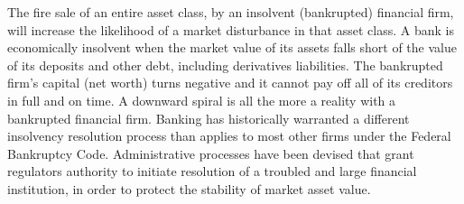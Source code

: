 The fire sale of an entire asset class, by an insolvent (bankrupted) financial firm, will increase the likelihood of a market disturbance in that asset class.  A bank is economically insolvent when the market value of its assets falls short of the value of its deposits and other debt, including derivatives liabilities. The bankrupted firm's capital (net worth) turns negative and it cannot pay off all of its creditors in full and on time.  A downward spiral is all the more a reality with a bankrupted financial firm.  Banking has historically warranted a different insolvency resolution process than applies to most other firms under the Federal Bankruptcy Code.\cite{Bliss}  Administrative processes have been devised that grant regulators authority to initiate resolution of a troubled and large financial institution, in order to protect the stability of market asset value.  